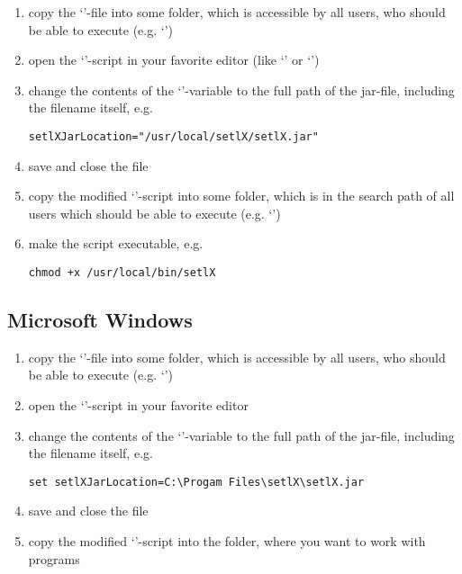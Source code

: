 \begin{enumerate}
	\item copy the `'-file into some folder, which is accessible by all users, who should be able to execute \setlX{} (e.g. `')
	\item open the `'-script in your favorite editor (like `' or `')
	\item change the contents of the `'-variable to the full path of the jar-file, including the filename itself, e.g.
\begin{lstlisting}[frame=none,numbers=none]
setlXJarLocation="/usr/local/setlX/setlX.jar"
\end{lstlisting}
	\item save and close the file
	\item copy the modified `'-script into some folder, which is in the search path of all users which should be able to execute \setlX{} (e.g. `')
	\item make the script executable, e.g.
\begin{lstlisting}[frame=none,numbers=none]
chmod +x /usr/local/bin/setlX
\end{lstlisting}
\end{enumerate}

\subsection{Microsoft Windows}

\begin{enumerate}
	\item copy the `'-file into some folder, which is accessible by all users, who should be able to execute \setlX{} (e.g. `')
	\item open the `'-script in your favorite editor
	\item change the contents of the `'-variable to the full path of the jar-file, including the filename itself, e.g.
\begin{lstlisting}[frame=none,numbers=none]
set setlXJarLocation=C:\Progam Files\setlX\setlX.jar
\end{lstlisting}
	\item save and close the file
	\item copy the modified `'-script into the folder, where you want to work with \setlX{} programs
\end{enumerate}

